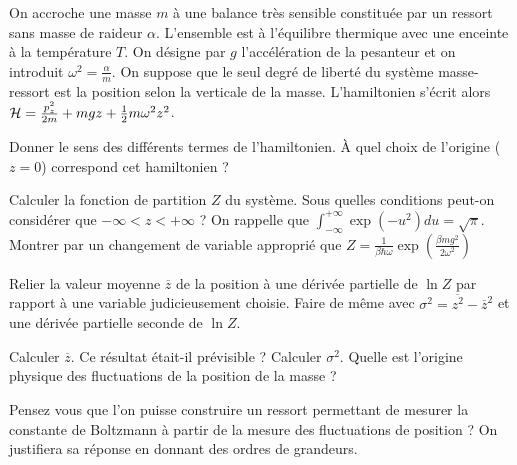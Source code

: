 On accroche une masse $m$ à une balance très sensible constituée par un ressort sans masse de raideur $\alpha$. L'ensemble est à l'équilibre thermique avec une enceinte à la température $T$. On désigne par $g$ l'accélération de la pesanteur et on introduit $\omega^2=\frac{\alpha}{m}$. On suppose que le seul degré de liberté du système masse-ressort est la position selon la verticale de la masse. L'hamiltonien  s'écrit alors ${\cal H}=\frac{p_z^2}{2m}+mgz+\frac{1}{2} m\omega^2 z^2$.

\medskip

\question Donner le sens des différents termes de l'hamiltonien. \`A quel choix de l'origine ($z=0$) correspond cet hamiltonien ? 

\question Calculer la fonction de partition $Z$ du système. Sous quelles conditions peut-on considérer que $-\infty < z < +\infty$ ? On rappelle que $\int_{-\infty}^{+\infty} \exp(-u^2) du= \sqrt{\pi}$. Montrer par un changement de variable approprié que $Z=\frac{1}{\beta \hbar \omega} \exp(\frac{\beta m g ^2}{2 \omega^2})$

\question Relier la valeur moyenne $\overline z$ de la position à une dérivée partielle de $\ln Z$ par rapport à une variable judicieusement choisie. Faire de même avec $\sigma^2=\overline{z^2} - \overline{z}^2$   et une dérivée partielle seconde de  $\ln Z$.

\question Calculer $\overline z$. Ce résultat était-il prévisible ? Calculer $\sigma^2$. Quelle est l'origine physique des fluctuations de la position de la masse ?

\question Pensez vous que l'on puisse construire un ressort permettant de mesurer la constante de Boltzmann à partir de la mesure des fluctuations de position ? On justifiera sa réponse en donnant des ordres de grandeurs.
